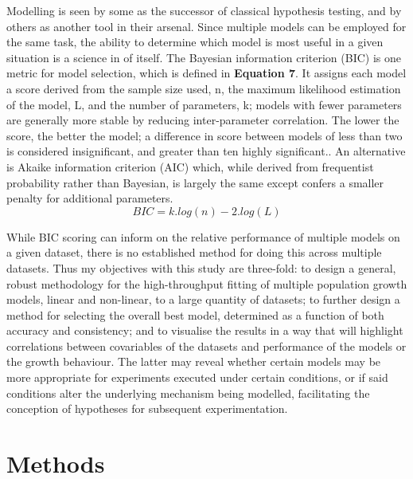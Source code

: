 \documentclass[11pt]{article}
\begin{document}
Modelling is seen by some as the successor of classical hypothesis testing, and by others as another tool in their arsenal.\parencite{Johnson2004} Since multiple models can be employed for the same task, the ability to determine which model is most useful in a given situation is a science in of itself. The Bayesian information criterion (BIC) is one metric for model selection, which is defined in \textbf{Equation 7}. It assigns each model a score derived from the sample size used, n, the maximum likelihood estimation of the model, L, and the number of parameters, k; models with fewer parameters are generally more stable by reducing inter-parameter correlation.\parencite{Akaike1974,Zwietering1990} The lower the score, the better the model; a difference in score between models of less than two is considered insignificant, and greater than ten highly significant.\parencite{Vrieze2012,Posada2004}. An alternative is Akaike information criterion (AIC) which, while derived from frequentist probability rather than Bayesian, is largely the same except confers a smaller penalty for additional parameters.\parencite{Posada2004} 
\begin{equation}
    BIC = k.log(n) - 2.log(L)
\end{equation}
\vspace{2mm}

\noindent While BIC scoring can inform on the relative performance of multiple models on a given dataset, there is no established method for doing this across multiple datasets. Thus my objectives with this study are three-fold: to design a general, robust methodology for the high-throughput fitting of multiple population growth models, linear and non-linear, to a large quantity of datasets; to further design a method for selecting the overall best model, determined as a function of both accuracy and consistency; and to visualise the results in a way that will highlight correlations between covariables of the datasets and performance of the models or the growth behaviour. The latter may reveal whether certain models may be more appropriate for experiments executed under certain conditions, or if said conditions alter the underlying mechanism being modelled, facilitating the conception of hypotheses for subsequent experimentation.



\vspace{5mm}
\section{Methods}%
\end{document}
